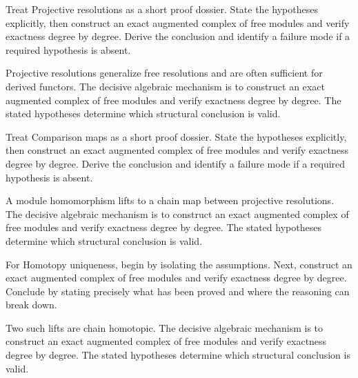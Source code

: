 \begin{problem}\label{prob:v23-problem-04}
Treat Projective resolutions as a short proof dossier. State the hypotheses explicitly, then construct an exact augmented complex of free modules and verify exactness degree by degree. Derive the conclusion and identify a failure mode if a required hypothesis is absent.
\end{problem}
\begin{solution}
Projective resolutions generalize free resolutions and are often sufficient for derived functors. The decisive algebraic mechanism is to construct an exact augmented complex of free modules and verify exactness degree by degree. The stated hypotheses determine which structural conclusion is valid.
\end{solution}

\begin{problem}\label{prob:v23-problem-05}
Treat Comparison maps as a short proof dossier. State the hypotheses explicitly, then construct an exact augmented complex of free modules and verify exactness degree by degree. Derive the conclusion and identify a failure mode if a required hypothesis is absent.
\end{problem}
\begin{solution}
A module homomorphism lifts to a chain map between projective resolutions. The decisive algebraic mechanism is to construct an exact augmented complex of free modules and verify exactness degree by degree. The stated hypotheses determine which structural conclusion is valid.
\end{solution}

\begin{problem}\label{prob:v23-problem-06}
For Homotopy uniqueness, begin by isolating the assumptions. Next, construct an exact augmented complex of free modules and verify exactness degree by degree. Conclude by stating precisely what has been proved and where the reasoning can break down.
\end{problem}
\begin{solution}
Two such lifts are chain homotopic. The decisive algebraic mechanism is to construct an exact augmented complex of free modules and verify exactness degree by degree. The stated hypotheses determine which structural conclusion is valid.
\end{solution}

